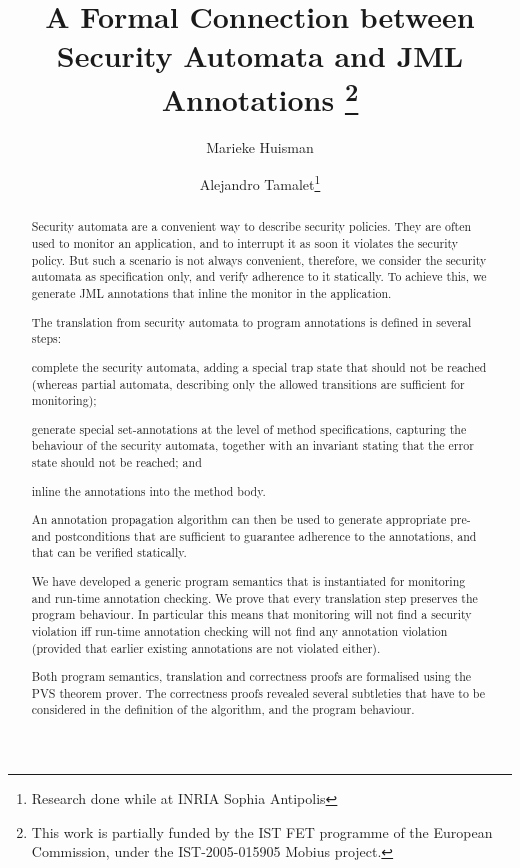 \documentclass[]{llncs}
\title{A Formal Connection between Security Automata and JML Annotations
\thanks{This work is partially funded by the IST FET
programme of the European Commission, under the IST-2005-015905
\textsf{Mobius} project.}}
\author{Marieke Huisman\inst{1} \and Alejandro Tamalet\inst{2}\thanks{Research done while at INRIA Sophia Antipolis}}
\institute{INRIA Sophia Antipolis, France \and
University of Nijmegen, Netherlands}
\begin{document}
\maketitle
\begin{abstract}
Security automata are a convenient way to describe security
policies. They are often used to monitor an application, and to
interrupt it as soon it violates the security policy. But such a
scenario is not always convenient, therefore, we consider the security
automata as specification only, and verify adherence to it
statically. To achieve this, we generate JML annotations that inline
the monitor in the application.

The translation from security automata to program annotations is
defined in several steps:
\begin{inparaenum}
\item complete the security automata, adding a special trap
state that should not be reached (whereas partial automata, describing
only the allowed transitions are sufficient for monitoring);
\item generate special set-annotations at the level of method
specifications, capturing the behaviour of the security automata,
together with an invariant stating that the error state should not be
reached; and
\item inline the annotations into the method body.
\end{inparaenum}
An annotation propagation algorithm can then be used to generate
appropriate pre- and postconditions that are sufficient to guarantee
adherence to the annotations, and that can be verified statically.

We have developed a generic program semantics that is instantiated for
monitoring and run-time annotation checking. We prove that every
translation step preserves the program behaviour. In particular this
means that monitoring will not find a security violation iff run-time
annotation checking will not find any annotation violation (provided
that earlier existing annotations are not violated either).

Both program semantics, translation and correctness proofs are
formalised using the PVS theorem prover. The correctness proofs
revealed several subtleties that have to be considered in the
definition of the algorithm, and the program behaviour.
\end{abstract}











\end{document}
